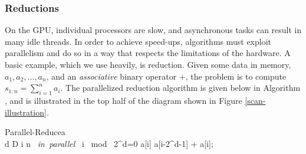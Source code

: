 {\subsubsection{Reductions}
\label{subsec:reduce}
On the GPU, individual processors are slow, and asynchronous tasks can result in many idle threads. In order to achieve speed-ups, algorithms must exploit parallelism and do so in a way that respects the limitations of the hardware. A basic example, which we use heavily, is reduction. Given some data in memory, $a_1, a_2, \ldots, a_n$, and an \textit{associative} binary operator $+$, the problem is to compute $s_{1:n}=\sum_{i=1}^n a_i$. The parallelized reduction algorithm is given below in Algorithm \label{reduce}, and is illustrated in the top half of the diagram shown in Figure \ref{scan-illustration}.  

\begin{pseudocode}[ruled]{Parallel-Reduce}{a}
\label{reduce}
\\
\FOR d  \TO D \DO \BEGIN
  \FOR i  \TO n \mbox{ \em in parallel }\DO \BEGIN
    \IF i \mbox{ mod } 2^d=0 \DO \BEGIN
    a[i] \GETS a[i-2^{d-1}] + a[i];\\
    \END \END \END
\end{pseudocode}

}
